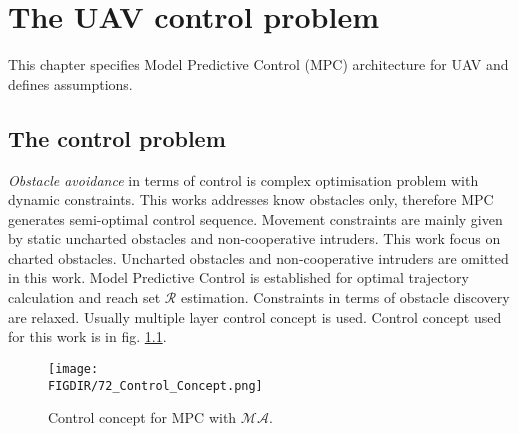 \chapter{The UAV control problem}\label{ch:UAVControlProblem}



\noindent This chapter specifies Model Predictive Control (MPC) architecture for UAV and defines assumptions.
\section{The control problem}
\noindent \textit{Obstacle avoidance} in terms of control is complex optimisation problem with dynamic constraints. This works addresses know obstacles only, therefore MPC generates semi-optimal control sequence. Movement constraints are mainly given by static uncharted obstacles and non-cooperative intruders. This work focus on charted obstacles. Uncharted obstacles and non-cooperative intruders are omitted in this work. Model Predictive Control is established for optimal trajectory calculation and reach set $\mathscr{R}$ estimation. Constraints in terms of obstacle discovery are relaxed. Usually multiple layer control concept is used. Control concept used for this work is in fig. \ref{fig:controlConceptIntro}.
\begin{figure}[H]
    \centering
    \texttt{[image: \\FIGDIR/72\_Control\_Concept.png]}
    \caption{Control concept for MPC with $\mathscr{MA}$.}
    \label{fig:controlConceptIntro}
\end{figure}

